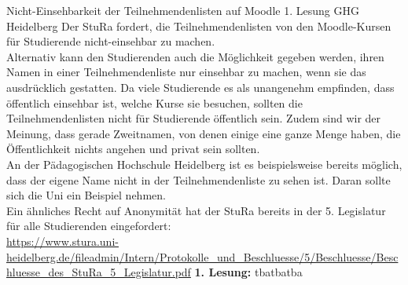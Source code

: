{
Nicht-Einsehbarkeit der Teilnehmendenlisten auf Moodle
}{
    1. Lesung
}{
    GHG Heidelberg
}{
    Der StuRa fordert, die Teilnehmendenlisten von den Moodle-Kursen für Studierende nicht-einsehbar zu
    machen.\\
    Alternativ kann den Studierenden auch die Möglichkeit gegeben werden, ihren Namen in einer
    Teilnehmendenliste nur einsehbar zu machen, wenn sie das ausdrücklich gestatten.
}{
    Da viele Studierende es als unangenehm empfinden, dass öffentlich einsehbar ist, welche Kurse sie
    besuchen, sollten die Teilnehmendenlisten nicht für Studierende öffentlich sein. Zudem sind wir der
    Meinung, dass gerade Zweitnamen, von denen einige eine ganze Menge haben, die Öffentlichkeit nichts
    angehen und privat sein sollten.\\
    An der Pädagogischen Hochschule Heidelberg ist es beispielsweise bereits möglich, dass der eigene
    Name nicht in der Teilnehmendenliste zu sehen ist. Daran sollte sich die Uni ein Beispiel nehmen.\\
    Ein ähnliches Recht auf Anonymität hat der StuRa bereits in der 5. Legislatur für alle Studierenden
    eingefordert:\\
    \url{https://www.stura.uni-heidelberg.de/fileadmin/Intern/Protokolle_und_Beschluesse/5/Beschluesse/Beschluesse_des_StuRa_5_Legislatur.pdf}
}{\textbf{1. Lesung:}
    \ul{
            \ul{}
            \ul{}
            \ul{}
            \ul{}
            \ul{}
    }
}{tba}{tba}{tba}
